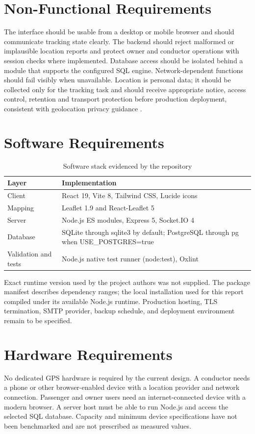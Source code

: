 \documentclass[12pt,a4paper]{report}
\begin{document}
\section{Non-Functional Requirements}
The interface should be usable from a desktop or mobile browser and should communicate tracking state clearly. The backend should reject malformed or implausible location reports and protect owner and conductor operations with session checks where implemented. Database access should be isolated behind a module that supports the configured SQL engine. Network-dependent functions should fail visibly when unavailable. Location is personal data; it should be collected only for the tracking task and should receive appropriate notice, access control, retention and transport protection before production deployment, consistent with geolocation privacy guidance \cite{w3cgeo}.

\section{Software Requirements}
\begin{table}[H]\centering\small\caption{Software stack evidenced by the repository}\label{tab:stack}
\begin{tabularx}{\textwidth}{p{}X}\toprule\textbf{Layer}&\textbf{Implementation}\\\midrule
Client&React 19, Vite 8, Tailwind CSS, Lucide icons\\
Mapping&Leaflet 1.9 and React-Leaflet 5\\
Server&Node.js ES modules, Express 5, Socket.IO 4\\
Database&SQLite through sqlite3 by default; PostgreSQL through pg when USE\_POSTGRES=true\\
Validation and tests&Node.js native test runner (node:test), Oxlint\\
\bottomrule\end{tabularx}\end{table}

Exact runtime version used by the project authors was not supplied. The package manifest describes dependency ranges; the local installation used for this report compiled under its available Node.js runtime. Production hosting, TLS termination, SMTP provider, backup schedule, and deployment environment remain to be specified.

\section{Hardware Requirements}
No dedicated GPS hardware is required by the current design. A conductor needs a phone or other browser-enabled device with a location provider and network connection. Passenger and owner users need an internet-connected device with a modern browser. A server host must be able to run Node.js and access the selected SQL database. Capacity and minimum device specifications have not been benchmarked and are not prescribed as measured values.
\end{document}
